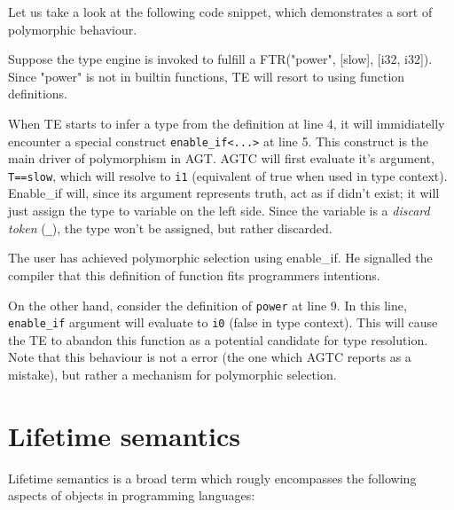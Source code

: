 \documentclass[times, utf8, diplomski]{fer}
\theoremstyle{definition}
\begin{document}
Let us take a look at the following code snippet, which demonstrates a sort of polymorphic behaviour.



Suppose the type engine is invoked to fulfill a FTR("power", [slow], [i32, i32]).
Since "power" is not in builtin functions, TE will resort to using function definitions.

When TE starts to infer a type from the definition at line 4, it will immidiatelly encounter a special
construct \texttt{enable\_if<...>} at line 5. This construct is the main driver of polymorphism in AGT.
AGTC will first evaluate it's argument, \texttt{T==slow}, which will resolve to \texttt{i1} (equivalent of
true when used in type context). Enable\_if will, since its argument represents truth, act as if didn't exist;
it will just assign the type to variable on the left side. Since the variable is a \textit{discard token}
(\texttt{\_}), the type won't be assigned, but rather discarded.

The user has achieved polymorphic selection using enable\_if. He signalled the compiler that this
definition of  function fits programmers intentions.

On the other hand, consider the definition of \texttt{power} at line 9.
In this line, \texttt{enable\_if} argument will evaluate to \texttt{i0} (false in type context).
This will cause the TE to abandon this function as a potential candidate for type resolution.
Note that this behaviour is not a \critical error (the one which AGTC reports as a mistake),
but rather a mechanism for polymorphic selection.

\section{Lifetime semantics}

Lifetime semantics is a broad term which rougly encompasses the following aspects of objects
in programming languages:
\end{document}
